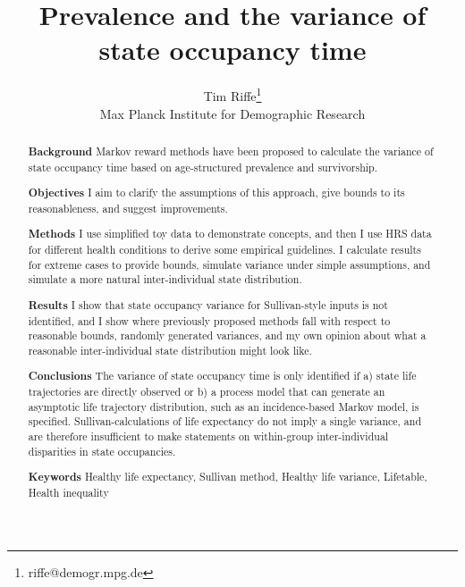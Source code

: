 \documentclass[a4paper]{article}
\newcommand{\absdiv}[1]{%
  \par\addvspace{.5\baselineskip}%
  \noindent\textbf{#1}\quad\ignorespaces
}
\begin{document}
\title{Prevalence and the variance of state occupancy time}
\author{Tim Riffe\thanks{riffe@demogr.mpg.de}\\Max Planck Institute for Demographic Research}
\maketitle

\vspace{-2em}

\begin{abstract}
\absdiv{Background} Markov reward methods have been proposed to calculate the variance of state occupancy time based on age-structured prevalence and survivorship.
\absdiv{Objectives} I aim to clarify the assumptions of this approach, give bounds to its reasonableness, and suggest improvements.
\absdiv{Methods} I use simplified toy data to demonstrate concepts, and then I use HRS data for different health conditions to derive some empirical guidelines. I calculate results for extreme cases to provide bounds, simulate variance under simple assumptions, and simulate a more natural inter-individual state distribution.
\absdiv{Results} I show that state occupancy variance for Sullivan-style inputs is not identified, and I show where previously proposed methods fall with respect to reasonable bounds, randomly generated variances, and my own opinion about what a reasonable inter-individual state distribution might look like.
\absdiv{Conclusions} The variance of state occupancy time is only identified if a) state life trajectories are directly observed or b) a process model that can generate an asymptotic life trajectory distribution, such as an incidence-based Markov model, is specified. Sullivan-calculations of life expectancy do not imply a single variance, and are therefore insufficient to make statements on within-group inter-individual disparities in state occupancies.
\absdiv{Keywords} Healthy life expectancy, Sullivan method, Healthy life variance, Lifetable, Health inequality
\end{abstract}
\end{document}
